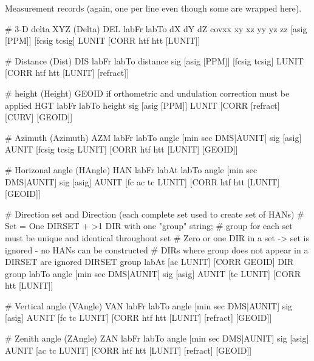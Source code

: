 Measurement records (again, one per line even though some are wrapped here).
\begin{Snippet}
# 3-D delta XYZ (Delta)
DEL labFr labTo dX dY dZ covxx xy xz yy yz zz [asig [PPM]] [fcsig tcsig] LUNIT
        [CORR htf htt [LUNIT]]

# Distance (Dist)
DIS labFr labTo distance sig [asig [PPM]] [fcsig tcsig] LUNIT
        [CORR htf htt [LUNIT] [refract]]

# height (Height) GEOID if orthometric and undulation correction must be applied
HGT labFr labTo height sig [asig [PPM]] LUNIT [CORR [refract]
        [CURV] [GEOID]]

# Azimuth (Azimuth)
AZM labFr labTo angle [min sec DMS|AUNIT] sig [asig] AUNIT [fcsig tcsig LUNIT]
        [CORR htf htt [LUNIT] [GEOID]]

# Horizonal angle (HAngle)
HAN labFr labAt labTo angle [min sec DMS|AUNIT] sig [asig] AUNIT [fc ac tc LUNIT]
        [CORR htf htt [LUNIT] [GEOID]]

# Direction set and Direction (each complete set used to create set of HANs)
# Set = { One DIRSET + >1 DIR with one "group" string};
#   group for each set must be unique and identical throughout set
# Zero or one DIR in a set -> set is ignored - no HANs can be constructed
# DIRs where group does not appear in a DIRSET are ignored
DIRSET group labAt [ac LUNIT] [CORR GEOID]
DIR group labTo angle [min sec DMS|AUNIT] sig [asig] AUNIT [tc LUNIT]
        [CORR htt [LUNIT]]

# Vertical angle (VAngle)
VAN labFr labTo angle [min sec DMS|AUNIT] sig [asig] AUNIT [fc tc LUNIT]
        [CORR htf htt [LUNIT] [refract] [GEOID]]

# Zenith angle (ZAngle)
ZAN labFr labTo angle [min sec DMS|AUNIT] sig [asig] AUNIT [ac tc LUNIT]
        [CORR htf htt [LUNIT] [refract] [GEOID]]
\end{Snippet}

